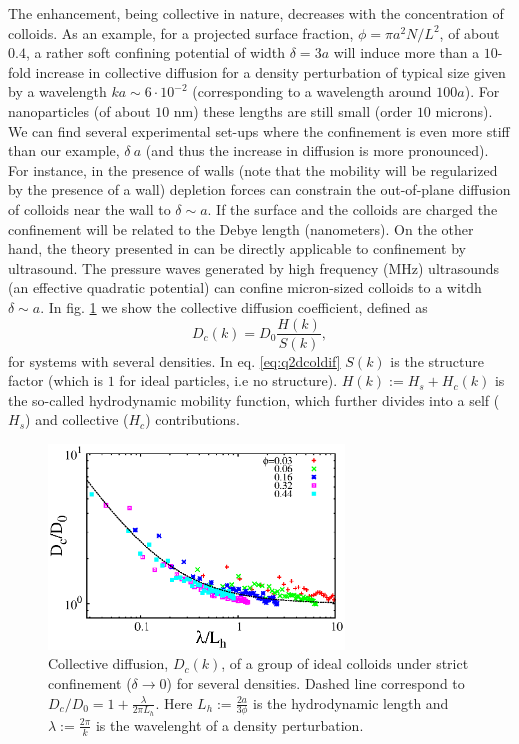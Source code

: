 \documentclass[ twoside,openright,titlepage,numbers=noenddot,%
headinclude,footinclude,cleardoublepage=empty,abstract=on,
BCOR=5mm,paper=a4,fontsize=11pt, dvipsnames
]{scrreprt}
\begin{document}
  The enhancement, being collective in nature, decreases with the concentration of colloids. As an example, for a projected surface fraction, $\phi = \pi a^2N/L^2$, of about $0.4$, a rather soft confining potential of width $\delta = 3a$ will induce more than a $10$-fold increase in collective diffusion for a density perturbation of typical size given by a wavelength $ka \sim 6\cdot 10^{-2}$ (corresponding to a wavelength around $100a$). For nanoparticles (of about $10$ nm) these lengths are still small (order $10$ microns). We can find several experimental set-ups where the confinement is even more stiff than our example, $\delta ~a$ (and thus the increase in diffusion is more pronounced). For instance, in the presence of walls (note that the mobility will be regularized by the presence of a wall) depletion forces can constrain the out-of-plane diffusion of colloids near the wall to $\delta\sim a$. If the surface and the colloids are charged the confinement will be related to the Debye length (nanometers). On the other hand, the theory presented in \cite{Pelaez2017} can be directly applicable to confinement by ultrasound. The pressure waves generated by high frequency (MHz) ultrasounds (an effective quadratic potential) can confine micron-sized colloids to a witdh $\delta \sim a$.
  In fig. \ref{fig:q2DEnhancement} we show the collective diffusion coefficient, defined as
  \begin{equation}
    \label{eq:q2dcoldif}
    D_c(k) = D_0\frac{H(k)}{S(k)},
  \end{equation}
  for systems with several densities.
  In eq. \eqref{eq:q2dcoldif} $S(k)$ is the structure factor (which is $1$ for ideal particles, i.e no structure). $H(k):= H_s + H_c(k)$ is the so-called hydrodynamic mobility function, which further divides into a self ($H_s$) and collective ($H_c$) contributions.
  \begin{figure}[H]
    \label{fig:q2DEnhancement}
    \centering
    \includegraphics[width=0.7\textwidth]{gfx/q2DEnhancement}
    \caption{Collective diffusion, $D_c(k)$, of a group of ideal colloids under strict confinement ($\delta\rightarrow 0$) for several densities. Dashed line correspond to $D_c/D_0 = 1 + \frac{\lambda}{2\pi L_h}$. Here $L_h := \frac{2a}{3\phi}$ is the hydrodynamic length and $\lambda := \frac{2\pi}{k}$ is the wavelenght of a density perturbation.}
  \end{figure}
  
\end{document}
